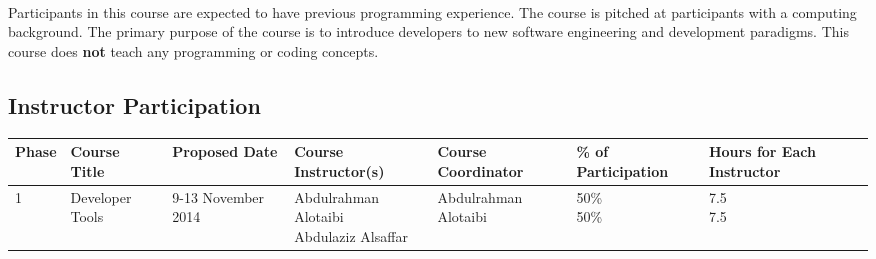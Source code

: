 \documentclass[a4paper,11pt]{article}
\begin{document}
\paragraph{}
Participants in this course are expected to have previous programming experience. The course is pitched at participants with a computing background. The primary purpose of the course is to introduce developers to new software engineering and development paradigms. This course does \textbf{not} teach any programming or coding concepts.

\pagebreak

\begin{landscape}
\section{Instructor Participation}
\begin{center}
	\begin{table}
	\begin{tabular}{|l|l|l|l|l|l|l|}
		\hline
			\textbf{Phase} & 
			\textbf{Course Title} & 
			\textbf{Proposed Date} & 
			\textbf{Course Instructor(s)} & 
			\textbf{Course Coordinator} & 
			\textbf{\% of Participation} & 
			\textbf{Hours for Each Instructor} \\
		\hline
			1 & 
			Developer Tools & 
			9-13 November 2014 & 
			\parbox[c]{0.33\textwidth}{Abdulrahman Alotaibi\\Abdulaziz Alsa{f}far} & 
			Abdulrahman Alotaibi & 
			\parbox[c]{0.33\textwidth}{50\%\\50\%} & 
			\parbox[c]{0.33\textwidth}{7.5\\7.5} \\
		\hline
	\end{tabular}
	\end{table}
\end{center}
\end{landscape}
\end{document}
